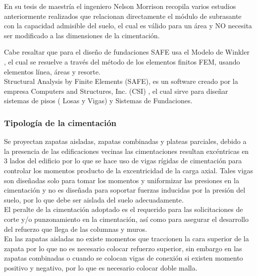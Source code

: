 \documentclass{article}%
\begin{document}
\newpage
En su tesis de maestría el ingeniero Nelson Morrison recopila varios estudios anteriormente realizados que relacionan directamente el módulo de subrasante con la capacidad admisible del suelo, el cual es válido para un área y NO necesita ser modificado a las dimensiones de la cimentación.


Cabe resaltar que para el diseño de fundaciones SAFE usa el Modelo de Winkler , el cual se resuelve a través del método de los elementos finitos FEM, usando elementos línea, áreas y resorte.\\
Structural Analysis by Finite Elements (SAFE), es un software creado por la empresa Computers and Structures, Inc. (CSI) , el cual sirve para diseñar sistemas de pisos ( Losas y Vigas) y Sistemas de Fundaciones.

\subsubsection{Tipología de la cimentación}
Se proyectan zapatas aisladas, zapatas combinadas y plateas parciales, debido a la presencia de las edificaciones vecinas las cimentaciones resultan excéntricas en 3 lados del edificio por lo que se hace uso de vigas rígidas de cimentación para controlar los momentos producto de la excentricidad de la carga axial. Tales vigas son diseñadas solo para tomar los momentos y uniformizar las presiones en la cimentación y no es diseñada para soportar fuerzas inducidas por la presión del suelo, por lo que debe ser aislada del suelo adecuadamente.\\
El peralte de la cimentación adoptado es el requerido para las solicitaciones de corte y/o punzonamiento en la cimentación, así como para asegurar el desarrollo del refuerzo que llega de las columnas y muros.\\
En las zapatas aisladas no existe momentos que traccionen la cara superior de la zapata por lo que no es necesario colocar refuerzo superior, sin embargo en las zapatas combinadas o cuando se colocan vigas de conexión si existen momento positivo y negativo, por lo que es necesario colocar doble malla.
\end{document}
